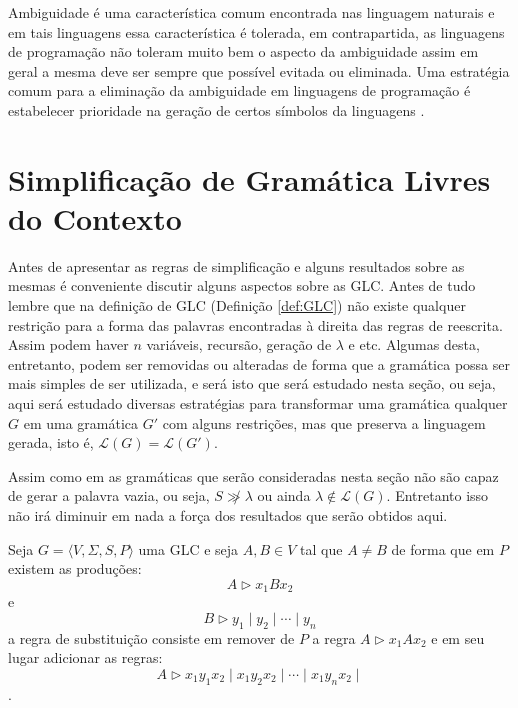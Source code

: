 Ambiguidade é uma característica comum encontrada nas linguagem naturais \cite{benjaLivro2010} e em tais linguagens essa característica é tolerada, em contrapartida, as linguagens de programação não toleram muito bem o aspecto da ambiguidade assim em geral a mesma deve ser sempre que possível evitada ou eliminada. Uma estratégia comum para a eliminação da ambiguidade em linguagens de programação é estabelecer prioridade na geração de certos símbolos da linguagens \cite{benjaLivro2010, aho2007}. 

\section{Simplificação de Gramática Livres do Contexto}\label{sec:SimplficacaoGLC}

Antes de apresentar as regras de simplificação e alguns resultados sobre as mesmas é conveniente discutir alguns aspectos sobre as GLC. Antes de tudo lembre que na definição de GLC (Definição \ref{def:GLC}) não existe qualquer restrição para a forma das palavras encontradas à direita das regras de reescrita. Assim podem haver $n$ variáveis, recursão, geração de $\lambda$ e etc. Algumas desta, entretanto, podem ser removidas ou alteradas de forma que a gramática possa ser mais simples de ser utilizada, e será isto que será estudado nesta seção, ou seja, aqui será estudado diversas estratégias para transformar uma gramática qualquer $G$ em uma gramática $G'$ com alguns restrições, mas que preserva a linguagem gerada, isto é, $\mathcal{L}(G) = \mathcal{L}(G')$. 

\begin{remark}
    Assim como em \cite{benjaLivro2010} as gramáticas que serão consideradas nesta seção não são capaz de gerar a palavra vazia, ou seja, $S \not\gg \lambda$ ou ainda $\lambda \notin \mathcal{L}(G)$. Entretanto isso não irá diminuir em nada a força dos resultados que serão obtidos aqui.
\end{remark}

\begin{definition}\label{def:RegraSubstituicao}
    Seja $G = \langle V, \Sigma, S, P\rangle$ uma GLC e seja $A, B \in V$ tal que $A \neq B$ de forma que em $P$ existem as produções:
    $$A \rhd x_1Bx_2$$
    e
    $$B \rhd y_1 \mid y_2 \mid \cdots \mid y_n$$
    a regra de substituição consiste em remover de $P$ a regra $A \rhd x_1A x_2$ e em seu lugar adicionar as regras:
    $$A \rhd x_1y_1x_2 \mid x_1y_2x_2 \mid \cdots \mid x_1y_nx_2 \mid$$.
\end{definition}

